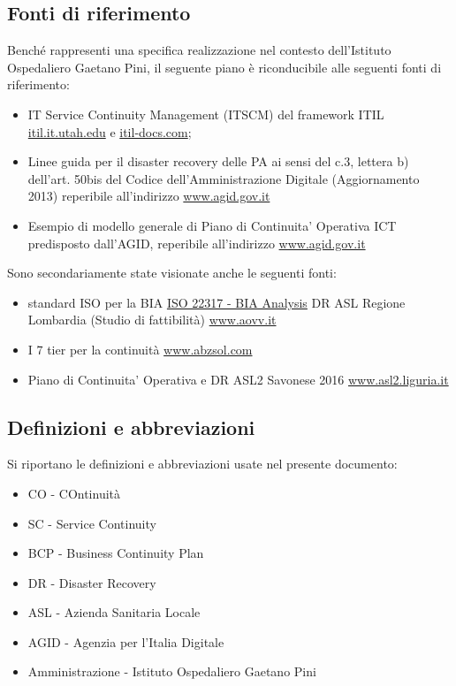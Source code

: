 \subsection{Fonti di riferimento}
Benché rappresenti  una  specifica realizzazione  nel  contesto dell'Istituto Ospedaliero Gaetano Pini, il seguente piano è riconducibile alle seguenti fonti di riferimento: 
\begin{itemize}
\item IT Service Continuity Management (ITSCM) del framework ITIL \href{http://itil.it.utah.edu/downloads/fits_servcont.pdf}{itil.it.utah.edu} e \href{http://itil-docs.com/itil-service-delivery/it-service-continuity/}{itil-docs.com}; 
\item Linee guida per il disaster recovery delle PA ai sensi del c.3, lettera b) dell’art. 50bis del Codice dell’Amministrazione Digitale (Aggiornamento 2013) reperibile all'indirizzo
\href{https://www.agid.gov.it/sites/default/files/repository_files/linee_guida/linee-guida-dr.pdf}{www.agid.gov.it}
\item Esempio di modello generale di Piano di Continuita’ Operativa ICT predisposto dall'AGID, reperibile all'indirizzo
\href{https://www.agid.gov.it/sites/default/files/repository_files/documenti_indirizzo/modello-pco-per-pa_0.pdf}{www.agid.gov.it}
\end{itemize}
Sono secondariamente state visionate anche le seguenti fonti:
\begin{itemize}
\item standard ISO per la BIA
\href{https://www.slideshare.net/TheBCEye/isos-newest-standard-the-bia-iso-22317}{ISO 22317 - BIA Analysis}
DR ASL Regione Lombardia (Studio di fattibilità) \href{http://www.aovv.it/files/doc/787cc45a808910ec2c15e93f13ed141d.pdf}{www.aovv.it}
\item I 7 tier per la continuità \href{https://www.abzsol.com/cms/images/stories/pdf/business_continuity.pdf}{www.abzsol.com}
\item Piano di Continuita’ Operativa e DR ASL2 Savonese 2016 \href{http://www.asl2.liguria.it/pdf/documenti_riservati/AreaDocumentaleArchivistica/Regolamenti/ALL4MANUALEDLB317-16.pdf}{www.asl2.liguria.it}
\end{itemize}

\subsection{Definizioni e abbreviazioni}
Si riportano le definizioni e abbreviazioni usate nel presente documento:
\begin{itemize}
\item CO - COntinuità
\item SC - Service Continuity
\item BCP - Business Continuity Plan
\item DR - Disaster Recovery
\item ASL - Azienda Sanitaria Locale
\item AGID - Agenzia per l'Italia Digitale
\item Amministrazione - Istituto Ospedaliero Gaetano Pini
\end{itemize}

